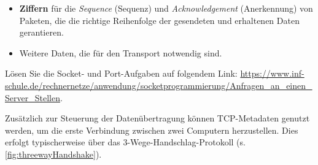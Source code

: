 \begin{itemize}
\begin{table}[H]
\begin{tabular}{c||c|c}
			      \bottomrule
		      \end{tabular}
		      \caption{Gängige \gls{TCP}-Ports, Anwendungen und deren Verwendung}
		      \label{tab:tcpPorts}
	      \end{table}
	      Sowohl der \textit{Client} wie auch der \textit{Server} versehen die Daten mit jeweils einer Zahl, die für den Ursprungs-Port (\textit{Source Port}), respektive den Ziel-Port (\textit{Destination Port}) stehen.
	\item \textbf{Ziffern} für die \textit{Sequence} (Sequenz) und \textit{Acknowledgement} (Anerkennung) von Paketen, die die richtige Reihenfolge der gesendeten und erhaltenen Daten gerantieren.
	\item Weitere Daten, die für den Transport notwendig sind.
\end{itemize}

\begin{mychallenge}
	Lösen Sie die Socket- und Port-Aufgaben auf folgendem Link: \url{https://www.inf-schule.de/rechnernetze/anwendung/socketprogrammierung/Anfragen_an_einen_Server_Stellen}.
\end{mychallenge}

Zusätzlich zur Steuerung der Datenübertragung können \gls{TCP}-Metadaten genutzt werden, um die erste Verbindung zwischen zwei Computern herzustellen. Dies erfolgt typischerweise über das 3-Wege-Handschlag-Protokoll (s. \cref{fig:threewayHandshake}).

